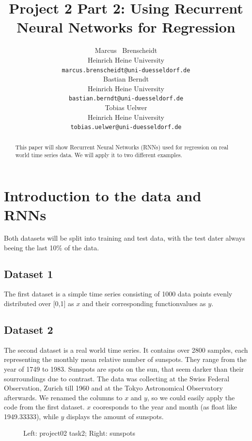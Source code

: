 \documentclass{article}
\title{Project 2 Part 2: Using Recurrent Neural Networks for Regression}
\author{
  Marcus ~Brenscheidt \\
  Heinrich Heine University\\
  \texttt{marcus.brenscheidt@uni-duesseldorf.de} \\
  \And
  Bastian Berndt \\
  Heinrich Heine University\\
  \texttt{bastian.berndt@uni-duesseldorf.de} \\
  \And
  Tobias Uelwer \\
  Heinrich Heine University\\
  \texttt{tobias.uelwer@uni-duesseldorf.de} \\
}
\begin{document}

\maketitle

\begin{abstract}
  This paper will show Recurrent Neural Networks (RNNs) used for regression on real world time series data. We will apply it to two different examples. 
\end{abstract}

\section{Introduction to the data and RNNs}
Both datasets will be split into training and test data, with the test dater always beeing the last 10\% of the data.
\subsection{Dataset 1}
The first dataset is a simple time series consisting of 1000 data points evenly distributed over [0,1] as $x$ and their corresponding functionvalues as $y$.

\subsection{Dataset 2}
The second dataset is a real world time series. It contains over 2800 samples, each representing the monthly mean relative number of sunspots. They range from the year of 1749 to 1983. Sunspots are spots on the sun, that seem darker than their sourroundings due to contrast. The data was collecting at the Swiss Federal Observation, Zurich till 1960 and at the Tokyo Astronomical Observatory afterwards. We renamed the columns to $x$ and $y$, so we could easily apply the code from the first dataset. $x$ cooresponds to the year and month (as float like 1949.33333), while $y$ displays the amount of sunspots.
\begin{figure}[h]
\centering
{}
\caption{Left: project02 task2; Right: sunspots}
\end{figure}
\newpage
\end{document}
